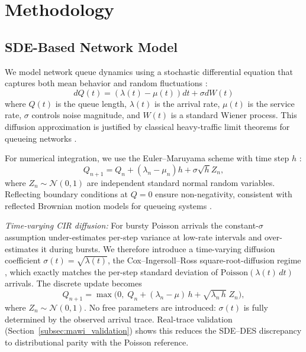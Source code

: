 \documentclass[journal]{IEEEtran}
\begin{document}
\section{Methodology}

\subsection{SDE-Based Network Model}

We model network queue dynamics using a stochastic differential equation that captures both mean
behavior and random fluctuations \cite{kloeden1992,khasminskii2012}:
\begin{equation}
    dQ(t) = (\lambda(t) - \mu(t))dt + \sigma dW(t)
    \label{eq:sde}
\end{equation}
where $Q(t)$ is the queue length, $\lambda(t)$ is the arrival rate, $\mu(t)$ is the service rate,
$\sigma$ controls noise magnitude, and $W(t)$ is a standard Wiener process. This diffusion
approximation is justified by classical heavy-traffic limit theorems for queueing networks
\cite{kang2007,whitt2002}.

For numerical integration, we use the Euler--Maruyama scheme with time step $h$
\cite{kloeden1992}:
\begin{equation}
    Q_{n+1} = Q_n + (\lambda_n - \mu_n)h + \sigma\sqrt{h}Z_n ,
    \label{eq:euler}
\end{equation}
where $Z_n \sim \mathcal{N}(0,1)$ are independent standard normal random variables. Reflecting
boundary conditions at $Q=0$ ensure non-negativity, consistent with reflected Brownian motion
models for queueing systems \cite{harrison1985}.

\textit{Time-varying CIR diffusion:}
For bursty Poisson arrivals the constant-$\sigma$ assumption under-estimates per-step variance
at low-rate intervals and over-estimates it during bursts. We therefore introduce a
time-varying diffusion coefficient $\sigma(t)=\sqrt{\lambda(t)}$, the
Cox--Ingersoll--Ross square-root-diffusion regime \cite{kang2007}, which exactly matches the
per-step standard deviation of $\mathrm{Poisson}(\lambda(t)\,dt)$ arrivals. The discrete update
becomes
\begin{equation}
    Q_{n+1} = \max\!\bigl(0,\; Q_n + (\lambda_n - \mu)\,h + \sqrt{\lambda_n\,h}\;Z_n\bigr),
    \label{eq:tv_sigma}
\end{equation}
where $Z_n \sim \mathcal{N}(0,1)$. No free parameters are introduced: $\sigma(t)$ is fully
determined by the observed arrival trace. Real-trace validation
(Section~\ref{subsec:mawi_validation}) shows this reduces the SDE--DES discrepancy to
distributional parity with the Poisson reference.
\end{document}
